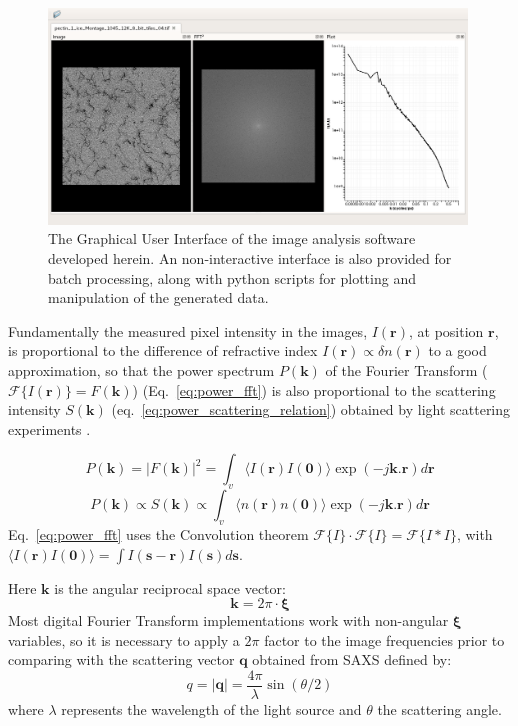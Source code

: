 \begin{figure}[!h]
  \centering
  \includegraphics[width=0.99\textwidth]{Figures/chapter-temsaxs/software_screenshot.png}
  \caption{The Graphical User Interface of the image analysis software developed herein. An non-interactive interface is also provided for batch processing, along with python scripts for plotting and manipulation of the generated data.}\label{fig:fig_gui}
\end{figure}


Fundamentally the measured pixel intensity in the images, $I(\bm{r})$, at position $\bm{r}$, is proportional to the difference of refractive index $I(\bm{r}) \propto \delta n(\bm{r})$  to a good approximation, so that the power spectrum $P(\bm{k})$ of the Fourier Transform ($\mathscr{F}\{I(\bm{r})\} = F(\bm{k})$)  (Eq.~\ref{eq:power_fft}) is also proportional to the scattering intensity $S(\bm{k})$ (eq.~\ref{eq:power_scattering_relation}) obtained by light scattering experiments \cite{tanaka_application_1986}.

\begin{equation}\label{eq:power_fft}
  P(\bm{k}) = |F(\bm{k})|^2 = \int_{v}\langle I(\bm{r})I(\bm{0})\rangle \exp(-j\bm{k}.\bm{r})d\bm{r}
\end{equation}
\begin{equation}\label{eq:power_scattering_relation}
   P(\bm{k}) \propto S(\bm{k}) \propto \int_{v}\langle n(\bm{r})n(\bm{0})\rangle \exp(-j \bm{k}.\bm{r})d\bm{r}
\end{equation}
Eq.~\ref{eq:power_fft} uses the Convolution theorem $\mathscr{F}\{I\} \cdot \mathscr{F}\{I\} = \mathscr{F}\{I*I\} $, with $\langle I(\bm{r})I(\bm{0})\rangle = \int I(\bm{s} - \bm{r})I(\bm{s}) d\bm{s}$.

\noindent Here $\bm{k}$ is the angular reciprocal space vector:
\begin{equation}\label{angular_freq}
  \bm{k} = 2\pi \cdot \bm{\xi}
\end{equation}
Most digital Fourier Transform implementations work with non-angular $\bm{\xi}$ variables, so it is necessary to apply a $2\pi$ factor to the image frequencies prior to comparing with the scattering vector $\bm{q}$ obtained from SAXS defined by:
\begin{equation}
q = |\bm{q}| = \frac{4\pi}{\lambda}\sin(\theta/2)
\end{equation}where $\lambda$ represents the wavelength of the light source and $\theta$ the scattering angle.


